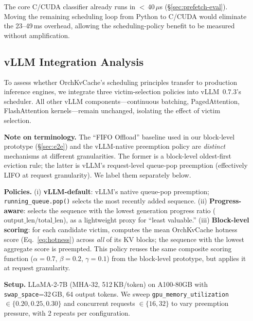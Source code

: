 \documentclass[conference]{IEEEtran}
\begin{document}
The core C/CUDA classifier already runs in $<$\,40\,$\mu$s (\S\ref{sec:prefetch-eval}). Moving the remaining scheduling loop from Python to C/CUDA would eliminate the 23--49\,ms overhead, allowing the scheduling-policy benefit to be measured without amplification.

\subsection{vLLM Integration Analysis}
\label{sec:vllm-integration}

To assess whether OrchKvCache's scheduling principles transfer to production inference engines, we integrate three victim-selection policies into vLLM~0.7.3's scheduler. All other vLLM components---continuous batching, PagedAttention, FlashAttention kernels---remain unchanged, isolating the effect of victim selection.

\textbf{Note on terminology.} The ``FIFO Offload'' baseline used in our block-level prototype (\S\ref{sec:e2e}) and the vLLM-native preemption policy are \emph{distinct} mechanisms at different granularities. The former is a block-level oldest-first eviction rule; the latter is vLLM's request-level queue-pop preemption (effectively LIFO at request granularity). We label them separately below.

\textbf{Policies.} (i) \textbf{vLLM-default}: vLLM's native queue-pop preemption; \texttt{running\_queue.pop()} selects the most recently added sequence. (ii) \textbf{Progress-aware}: selects the sequence with the lowest generation progress ratio ($\text{output\_len} / \text{total\_len}$), as a lightweight proxy for ``least valuable.'' (iii) \textbf{Block-level scoring}: for each candidate victim, computes the mean OrchKvCache hotness score (Eq.~\ref{eq:hotness}) across \emph{all} of its KV blocks; the sequence with the lowest aggregate score is preempted. This policy reuses the same composite scoring function ($\alpha{=}0.7$, $\beta{=}0.2$, $\gamma{=}0.1$) from the block-level prototype, but applies it at request granularity.

\textbf{Setup.} LLaMA-2-7B (MHA-32, 512\,KB/token) on A100-80GB with \texttt{swap\_space}=32\,GB, 64 output tokens. We sweep \texttt{gpu\_memory\_utilization} $\in \{0.20, 0.25, 0.30\}$ and concurrent requests $\in \{16, 32\}$ to vary preemption pressure, with 2 repeats per configuration.
\end{document}
